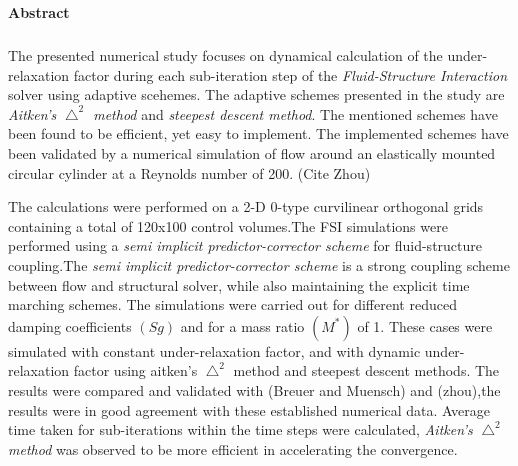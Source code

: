 %
% 

\chapter*{\ }


\begin{center}
	\begin{large}
		\textbf{Abstract}
	\end{large}
\end{center}
\vspace{0.75em}

\paragraph*{}

The presented numerical study focuses on dynamical calculation of the under-relaxation factor during each sub-iteration step of the \textit{Fluid-Structure Interaction} solver using adaptive scehemes. The adaptive schemes presented in the study are \textit{Aitken's $\bigtriangleup^{2}$ method} and \textit{steepest descent method}. The mentioned schemes have been found to be efficient, yet easy to implement. The implemented schemes have been validated by a numerical simulation of flow around an elastically mounted circular cylinder at a Reynolds number of 200. (Cite Zhou)\vspace{0.75em}

The calculations were performed on a 2-D 0-type curvilinear orthogonal grids containing a total of 120x100 control volumes.The FSI simulations were performed using a \textit{semi implicit predictor-corrector scheme} for fluid-structure coupling.The \textit{semi implicit predictor-corrector scheme} is a strong coupling scheme between flow and structural solver, while also maintaining the explicit time marching schemes. The simulations were carried out for different reduced damping coefficients $(Sg)$ and for a mass ratio $(M^{*})$ of 1. These cases were simulated with constant under-relaxation factor, and with dynamic under-relaxation factor using aitken's $\bigtriangleup^{2}$ method and steepest descent methods. The results were compared and validated with (Breuer and Muensch) and (zhou),the results were in good agreement with these established numerical data. Average time taken for sub-iterations within the time steps were calculated, \textit{Aitken's $\bigtriangleup^{2}$ method} was observed to be more efficient in accelerating the convergence.


